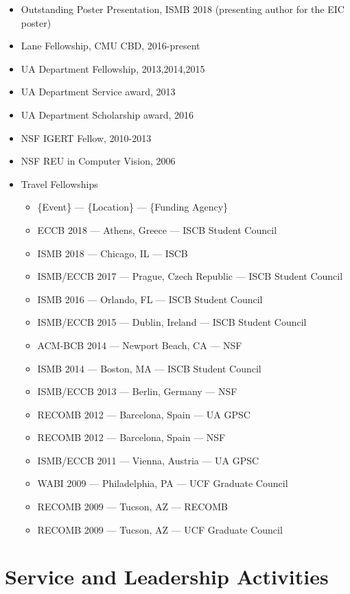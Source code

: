 \documentclass[10pt,letterpaper]{article}
\begin{document}
\begin{itemize}
    \item Outstanding Poster Presentation, ISMB 2018 (presenting author for the EIC poster)
    \item Lane Fellowship, CMU CBD, 2016-present
    \item UA Department Fellowship, 2013,2014,2015
    \item UA Department Service award, 2013
    \item UA Department Scholarship award, 2016
    \item NSF IGERT Fellow, 2010-2013
    \item NSF REU in Computer Vision, 2006
    \item Travel Fellowships
    \begin{itemize}
    	\item \{Event\} --- \{Location\} --- \{Funding Agency\}
    	\item ECCB 2018 --- Athens, Greece --- ISCB Student Council
    	\item ISMB 2018 --- Chicago, IL --- ISCB
	\item ISMB/ECCB 2017 --- Prague, Czech Republic --- ISCB Student Council 
	\item ISMB 2016 --- Orlando, FL --- ISCB Student Council
	\item ISMB/ECCB 2015 --- Dublin, Ireland --- ISCB Student Council
	\item ACM-BCB 2014 --- Newport Beach, CA --- NSF
	\item ISMB 2014 --- Boston, MA --- ISCB Student Council 
	\item ISMB/ECCB 2013 --- Berlin, Germany --- NSF
	\item RECOMB 2012 --- Barcelona, Spain --- UA GPSC
	\item RECOMB 2012 --- Barcelona, Spain --- NSF
	\item ISMB/ECCB 2011 --- Vienna, Austria --- UA GPSC
	\item WABI 2009 --- Philadelphia, PA --- UCF Graduate Council 
	\item RECOMB 2009 --- Tucson, AZ --- RECOMB
	\item RECOMB 2009 --- Tucson, AZ --- UCF Graduate Council
    \end{itemize}
\end{itemize}

\section*{Service and Leadership Activities}
\end{document}
